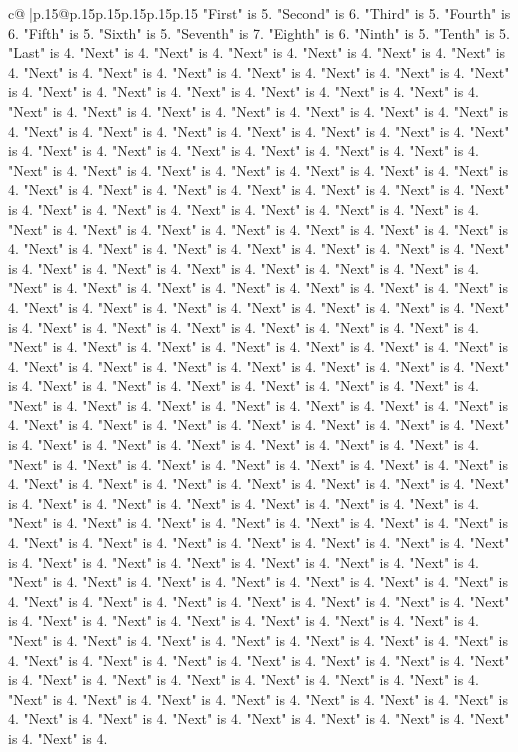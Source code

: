 \documentclass{article}
\begin{document}
{\begin{supertabular}{c@{$\;$}|p{.15\linewidth}@{}p{.15\linewidth}p{.15\linewidth}p{.15\linewidth}p{.15\linewidth}p{.15\linewidth}}
{{{"First" is 5. "Second" is 6. "Third" is 5. "Fourth" is 6. "Fifth" is 5. "Sixth" is 5. "Seventh" is 7. "Eighth" is 6. "Ninth" is 5. "Tenth" is 5. "Last" is 4. "Next" is 4. "Next" is 4. "Next" is 4. "Next" is 4. "Next" is 4. "Next" is 4. "Next" is 4. "Next" is 4. "Next" is 4. "Next" is 4. "Next" is 4. "Next" is 4. "Next" is 4. "Next" is 4. "Next" is 4. "Next" is 4. "Next" is 4. "Next" is 4. "Next" is 4. "Next" is 4. "Next" is 4. "Next" is 4. "Next" is 4. "Next" is 4. "Next" is 4. "Next" is 4. "Next" is 4. "Next" is 4. "Next" is 4. "Next" is 4. "Next" is 4. "Next" is 4. "Next" is 4. "Next" is 4. "Next" is 4. "Next" is 4. "Next" is 4. "Next" is 4. "Next" is 4. "Next" is 4. "Next" is 4. "Next" is 4. "Next" is 4. "Next" is 4. "Next" is 4. "Next" is 4. "Next" is 4. "Next" is 4. "Next" is 4. "Next" is 4. "Next" is 4. "Next" is 4. "Next" is 4. "Next" is 4. "Next" is 4. "Next" is 4. "Next" is 4. "Next" is 4. "Next" is 4. "Next" is 4. "Next" is 4. "Next" is 4. "Next" is 4. "Next" is 4. "Next" is 4. "Next" is 4. "Next" is 4. "Next" is 4. "Next" is 4. "Next" is 4. "Next" is 4. "Next" is 4. "Next" is 4. "Next" is 4. "Next" is 4. "Next" is 4. "Next" is 4. "Next" is 4. "Next" is 4. "Next" is 4. "Next" is 4. "Next" is 4. "Next" is 4. "Next" is 4. "Next" is 4. "Next" is 4. "Next" is 4. "Next" is 4. "Next" is 4. "Next" is 4. "Next" is 4. "Next" is 4. "Next" is 4. "Next" is 4. "Next" is 4. "Next" is 4. "Next" is 4. "Next" is 4. "Next" is 4. "Next" is 4. "Next" is 4. "Next" is 4. "Next" is 4. "Next" is 4. "Next" is 4. "Next" is 4. "Next" is 4. "Next" is 4. "Next" is 4. "Next" is 4. "Next" is 4. "Next" is 4. "Next" is 4. "Next" is 4. "Next" is 4. "Next" is 4. "Next" is 4. "Next" is 4. "Next" is 4. "Next" is 4. "Next" is 4. "Next" is 4. "Next" is 4. "Next" is 4. "Next" is 4. "Next" is 4. "Next" is 4. "Next" is 4. "Next" is 4. "Next" is 4. "Next" is 4. "Next" is 4. "Next" is 4. "Next" is 4. "Next" is 4. "Next" is 4. "Next" is 4. "Next" is 4. "Next" is 4. "Next" is 4. "Next" is 4. "Next" is 4. "Next" is 4. "Next" is 4. "Next" is 4. "Next" is 4. "Next" is 4. "Next" is 4. "Next" is 4. "Next" is 4. "Next" is 4. "Next" is 4. "Next" is 4. "Next" is 4. "Next" is 4. "Next" is 4. "Next" is 4. "Next" is 4. "Next" is 4. "Next" is 4. "Next" is 4. "Next" is 4. "Next" is 4. "Next" is 4. "Next" is 4. "Next" is 4. "Next" is 4. "Next" is 4. "Next" is 4. "Next" is 4. "Next" is 4. "Next" is 4. "Next" is 4. "Next" is 4. "Next" is 4. "Next" is 4. "Next" is 4. "Next" is 4. "Next" is 4. "Next" is 4. "Next" is 4. "Next" is 4. "Next" is 4. "Next" is 4. "Next" is 4. "Next" is 4. "Next" is 4. "Next" is 4. "Next" is 4. "Next" is 4. "Next" is 4. "Next" is 4. "Next" is 4. "Next" is 4. "Next" is 4. "Next" is 4. "Next" is 4. "Next" is 4. "Next" is 4. "Next" is 4. "Next" is 4. "Next" is 4. "Next" is 4. "Next" is 4. "Next" is 4. "Next" is 4. "Next" is 4. "Next" is 4. "Next" is 4. "Next" is 4. "Next" is 4. "Next" is 4. "Next" is 4. "Next" is 4. "Next" is 4. "Next" is 4. "Next" is 4. "Next" is 4. "Next" is 4. "Next" is 4. "Next" is 4. "Next" is 4. "Next" is 4. "Next" is 4. "Next" is 4. "Next" is 4. "Next" is 4. "Next" is 4. "Next" is 4. "Next" is 4. "Next" is 4. "Next" is 4. "Next" is 4. "Next" is 4. }}}
\end{supertabular}}
\end{document}
